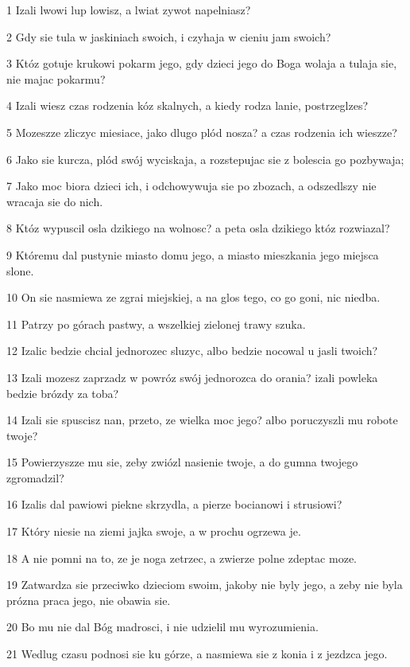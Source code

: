 \par 1 Izali lwowi lup lowisz, a lwiat zywot napelniasz?
\par 2 Gdy sie tula w jaskiniach swoich, i czyhaja w cieniu jam swoich?
\par 3 Któz gotuje krukowi pokarm jego, gdy dzieci jego do Boga wolaja a tulaja sie, nie majac pokarmu?
\par 4 Izali wiesz czas rodzenia kóz skalnych, a kiedy rodza lanie, postrzeglzes?
\par 5 Mozeszze zliczyc miesiace, jako dlugo plód nosza? a czas rodzenia ich wieszze?
\par 6 Jako sie kurcza, plód swój wyciskaja, a rozstepujac sie z bolescia go pozbywaja;
\par 7 Jako moc biora dzieci ich, i odchowywuja sie po zbozach, a odszedlszy nie wracaja sie do nich.
\par 8 Któz wypuscil osla dzikiego na wolnosc? a peta osla dzikiego któz rozwiazal?
\par 9 Któremu dal pustynie miasto domu jego, a miasto mieszkania jego miejsca slone.
\par 10 On sie nasmiewa ze zgrai miejskiej, a na glos tego, co go goni, nic niedba.
\par 11 Patrzy po górach pastwy, a wszelkiej zielonej trawy szuka.
\par 12 Izalic bedzie chcial jednorozec sluzyc, albo bedzie nocowal u jasli twoich?
\par 13 Izali mozesz zaprzadz w powróz swój jednorozca do orania? izali powleka bedzie brózdy za toba?
\par 14 Izali sie spuscisz nan, przeto, ze wielka moc jego? albo poruczyszli mu robote twoje?
\par 15 Powierzyszze mu sie, zeby zwiózl nasienie twoje, a do gumna twojego zgromadzil?
\par 16 Izalis dal pawiowi piekne skrzydla, a pierze bocianowi i strusiowi?
\par 17 Który niesie na ziemi jajka swoje, a w prochu ogrzewa je.
\par 18 A nie pomni na to, ze je noga zetrzec, a zwierze polne zdeptac moze.
\par 19 Zatwardza sie przeciwko dzieciom swoim, jakoby nie byly jego, a zeby nie byla prózna praca jego, nie obawia sie.
\par 20 Bo mu nie dal Bóg madrosci, i nie udzielil mu wyrozumienia.
\par 21 Wedlug czasu podnosi sie ku górze, a nasmiewa sie z konia i z jezdzca jego.
